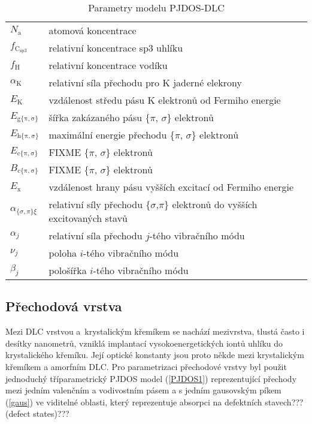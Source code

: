 \begin{table}
\centering
\begin{tabular}{l l}
\hline

$N_\mathrm{a}$ & atomová koncentrace \\
$f_\mathrm{C_{sp3}}$ & relativní koncentrace sp3 uhlíku \\
$f_\mathrm{H}$ & relativní koncentrace vodíku \\

$\alpha_\mathrm{K}$ & relativní síla přechodu pro K jaderné elekrony\\
$E_\mathrm{K}$ & vzdálenost středu pásu K elektronů od Fermiho energie\\

$E_\mathrm{g\{\pi,\sigma\}}$ & šířka zakázaného pásu \{$\pi$, $\sigma$\} elektronů\\
$E_\mathrm{h\{\pi,\sigma\}}$ & maximální energie přechodu \{$\pi$, $\sigma$\} elektronů\\
$E_\mathrm{c\{\pi,\sigma\}}$ & FIXME \{$\pi$, $\sigma$\} elektronů\\
$B_\mathrm{c\{\pi,\sigma\}}$ & FIXME \{$\pi$, $\sigma$\} elektronů\\

$E_\mathrm{x}$ & vzdálenost hrany pásu vyšších excitací od Fermiho energie\\
$\alpha_{\{\sigma,\pi\}\xi}$ & relativní síly přechodu \{$\sigma$,$\pi$\} elektronů do vyšších excitovaných stavů \\

$\alpha_j$ & relativní síla přechodu $j$-tého vibračního módu \\
$\nu_j$ & poloha $i$-tého vibračního módu\\
$\beta_j$ & pološířka $i$-tého vibračního módu\\
\hline

\end{tabular}
\label{DLCparametry}
\caption{Parametry modelu PJDOS-DLC}
\end{table}

\subsection{Přechodová vrstva}
Mezi DLC vrstvou a~krystalickým křemíkem se nachází mezivrstva, tlustá často i desítky nanometrů, vzniklá implantací vysokoenergetických iontů uhlíku do krystalického křemíku. Její optické konstanty jsou proto někde mezi krystalickým křemíkem a amorfním DLC. Pro parametrizaci přechodové vrstvy byl použit jednoduchý tříparametrický PJDOS model (\ref{PJDOS1}) reprezentující přechody mezi jedním valenčním a vodivostním pásem a s jedním gausovským píkem (\ref{gaus}) ve viditelné oblasti, který reprezentuje absorpci na defektních stavech??? (defect states)???

